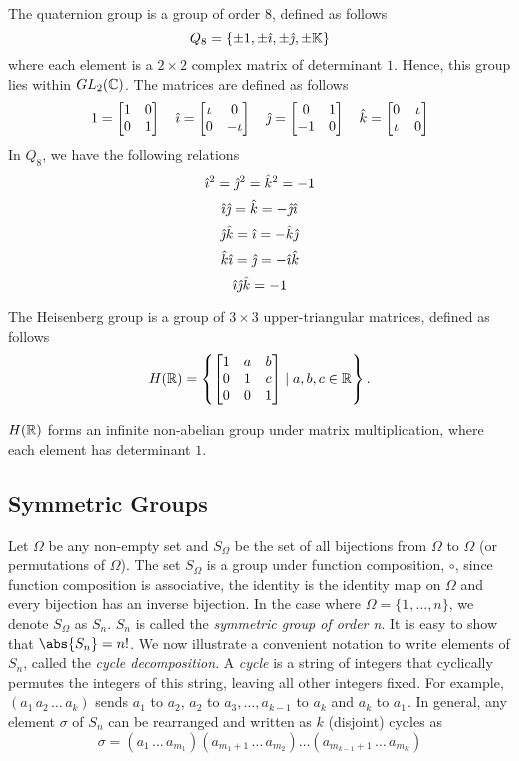 The quaternion group is a group of order $8$, defined as follows
\[
    Q_8 = \left\{ \pm 1, \pm \hat{\imath}, \pm \hat{\jmath}, \pm \mathbb{K} \right\}
\]
where each element is a $2 \times 2$ complex matrix of determinant $1$. Hence, this group lies within $GL_2(\mathbb{C})$. The matrices are defined as follows
\[
    1 = \begin{bmatrix}
        1 & 0 \\
        0 & 1
    \end{bmatrix} \quad
    \hat{\imath} = \begin{bmatrix}
        \iota & 0 \\
        0 & -\iota
    \end{bmatrix} \quad
    \hat{\jmath} = \begin{bmatrix}
        0 & 1 \\
        -1 & 0
    \end{bmatrix} \quad
    \hat{k} = \begin{bmatrix}
        0 & \iota \\
        \iota & 0
    \end{bmatrix}
\]
In $Q_8$, we have the following relations
\[
    {\hat{\imath}}^2 = {\hat{\jmath}}^2 = {\hat{k}}^2 = -1
\]
\[
    \hat{\imath}\hat{\jmath} = \hat{k} = -\hat{\jmath}\hat{\imath}
\]
\[
    \hat{\jmath}\hat{k} = \hat{\imath} = -\hat{k}\hat{\jmath}
\]
\[
    \hat{k}\hat{\imath} = \hat{\jmath} = -\hat{\imath}\hat{k}
\]
\[
    \hat{\imath}\hat{\jmath}\hat{k} = -1
\]

\medskip

The Heisenberg group is a group of $3\times 3$ upper-triangular matrices, defined as follows
\[
    H(\mathbb{R}) = \left\{ \begin{bmatrix}
        1 & a & b \\
        0 & 1 & c \\
        0 & 0 & 1
    \end{bmatrix} \mid a,b,c \in \mathbb{R} \right\}.
\]

$H(\mathbb{R})$ forms an infinite non-abelian  group under matrix multiplication, where each element has determinant $1$.

\subsection{Symmetric Groups}

Let $\Omega$ be any non-empty set and $S_{\Omega}$ be the set of all bijections from $\Omega$ to $\Omega$ (or permutations of $\Omega$). The set $S_{\Omega}$ is a group under function composition, $\circ$, since function composition is associative, the identity is the identity map on $\Omega$ and every bijection has an inverse bijection. In the case where $\Omega = \{1,\ldots,n\}$, we denote $S_{\Omega}$ as $S_n$. $S_n$ is called the \emph{symmetric group of order n}. It is easy to show that $\abs{S_n} = n!$. We now illustrate a convenient notation to write elements of $S_n$, called the \emph{cycle decomposition}. A \emph{cycle} is a string of integers that cyclically permutes the integers of this string, leaving all other integers fixed. For example, $(a_1 \, a_2 \, \ldots \, a_k)$ sends $a_1$ to $a_2$, $a_2$ to $a_3, \ldots, a_{k-1}$ to $a_k$ and $a_k$ to $a_1$. In general, any element $\sigma$ of $S_n$ can be rearranged and written as $k$ (disjoint) cycles as 
\[
    \sigma = (a_1 \, \ldots \, a_{m_1}) (a_{m_1+1} \, \ldots \, a_{m_2}) \ldots (a_{m_{k-1}+1} \, \ldots \, a_{m_k})
\]


